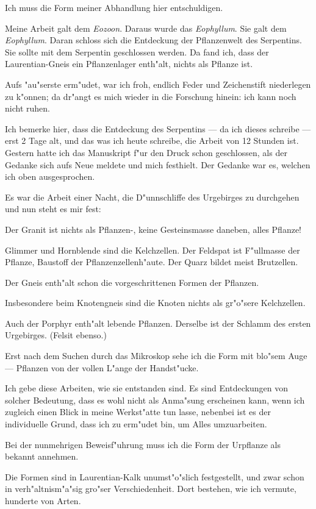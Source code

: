 \documentclass[a4paper, 11pt, oneside, german]{article}
\begin{document}
Ich muss die Form meiner Abhandlung hier entschuldigen.

Meine Arbeit galt dem \emph{Eozoon}. Daraus wurde das \emph{Eophyllum}. Sie galt dem \emph{Eophyllum}. Daran schloss sich die Entdeckung der Pflanzenwelt des Serpentins. Sie sollte mit dem Serpentin geschlossen werden. Da fand ich, dass der Laurentian-Gneis ein Pflanzenlager enth"alt, nichts als Pflanze ist.

Aufs "au"serste erm"udet, war ich froh, endlich Feder und Zeichenstift niederlegen zu k"onnen; da dr"angt es mich wieder in die Forschung hinein: ich kann noch nicht ruhen.

Ich bemerke hier, dass die Entdeckung des Serpentins --- da ich dieses schreibe --- erst 2 Tage alt, und das was ich heute schreibe, die Arbeit von 12 Stunden ist. Gestern hatte ich das Manuskript f"ur den Druck schon geschlossen, als der Gedanke sich aufs Neue meldete und mich festhielt. Der Gedanke war es, welchen ich oben ausgesprochen.

Es war die Arbeit einer Nacht, die D"unnschliffe des Urgebirges zu durchgehen und nun steht es mir fest:

Der Granit ist nichts als Pflanzen-, keine Gesteinsmasse daneben, alles Pflanze!

Glimmer und Hornblende sind die Kelchzellen. Der Feldspat ist F"ullmasse der Pflanze, Baustoff der Pflanzenzellenh"aute. Der Quarz bildet meist Brutzellen.

Der Gneis enth"alt schon die vorgeschrittenen Formen der Pflanzen.

Insbesondere beim Knotengneis sind die Knoten nichts als gr"o"sere Kelchzellen.

Auch der Porphyr enth"alt lebende Pflanzen. Derselbe ist der Schlamm des ersten Urgebirges. (Felsit ebenso.)

Erst nach dem Suchen durch das Mikroskop sehe ich die Form mit blo"sem Auge --- Pflanzen von der vollen L"ange der Handst"ucke.

Ich gebe diese Arbeiten, wie sie entstanden sind. Es sind Entdeckungen von solcher Bedeutung, dass es wohl nicht als Anma"sung erscheinen kann, wenn ich zugleich einen Blick in meine Werkst"atte tun lasse, nebenbei ist es der individuelle Grund, dass ich zu erm"udet bin, um Alles umzuarbeiten.

Bei der nunmehrigen Beweisf"uhrung muss ich die Form der Urpflanze als bekannt annehmen.

Die Formen sind in Laurentian-Kalk unumst"o"slich festgestellt, und zwar schon in verh"altnism"a"sig gro"ser Verschiedenheit. Dort bestehen, wie ich vermute, hunderte von Arten.
\end{document}
